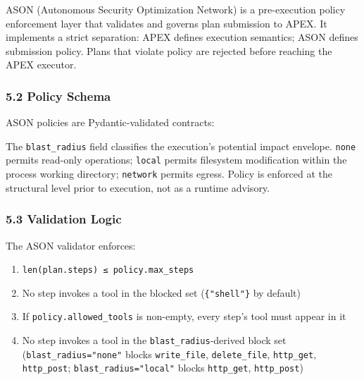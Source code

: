 ASON (Autonomous Security Optimization Network) is a pre-execution
policy enforcement layer that validates and governs plan submission to
APEX. It implements a strict separation: APEX defines execution
semantics; ASON defines submission policy. Plans that violate policy are
rejected before reaching the APEX executor.

\subsubsection{5.2 Policy Schema}\label{policy-schema}

ASON policies are Pydantic-validated contracts:

\begin{Shaded}
\begin{Highlighting}[]
          
\NormalTok{[}\NormalTok{] }
\NormalTok{    blast\_radius: Literal[}\NormalTok{, }\NormalTok{, }\NormalTok{]  }
  
\end{Highlighting}
\end{Shaded}

The \texttt{blast\_radius} field classifies the execution's potential
impact envelope. \texttt{none} permits read-only operations;
\texttt{local} permits filesystem modification within the process
working directory; \texttt{network} permits egress. Policy is enforced
at the structural level prior to execution, not as a runtime advisory.

\subsubsection{5.3 Validation Logic}\label{validation-logic}

The ASON validator enforces:

\begin{enumerate}
\def\labelenumi{\arabic{enumi}.}
\tightlist
\item
  \texttt{len(plan.steps)\ ≤\ policy.max\_steps}
\item
  No step invokes a tool in the blocked set (\texttt{\{"shell"\}} by
  default)
\item
  If \texttt{policy.allowed\_tools} is non-empty, every step's tool must
  appear in it
\item
  No step invokes a tool in the \texttt{blast\_radius}-derived block set
  (\texttt{blast\_radius="none"} blocks \texttt{write\_file},
  \texttt{delete\_file}, \texttt{http\_get}, \texttt{http\_post};
  \texttt{blast\_radius="local"} blocks \texttt{http\_get},
  \texttt{http\_post})
\end{enumerate}

